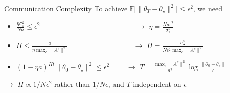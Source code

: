 \documentclass[aspectratio=169,14pt]{beamer}
\begin{document}
\begin{frame}{Communication Complexity}
  To achieve $\mathbb{E} \Big[ \| {\theta_T - \theta_\star} \|^2 \Big] \le \epsilon^2$, we need
  \begin{itemize}
  \item $\frac{\eta \sigma_\star^2}{N a} \le \epsilon^2$ ~~~~~~\,~~~~~~~~~~~~~~~~~~~ $\rightarrow$ $\eta = \frac{N a \epsilon^2}{\sigma_\star^2}$
  \item $H \le \frac{a}{\eta \max_c \| A^c \|^2}$ ~~~~~~~~~~~~~~~~~ $\rightarrow$ $H = \frac{ \sigma_\star^2 }{N \epsilon^2 \max_c \| A^c \|^2}$
  \item $(1 - \eta a)^{H t} \| \theta_0 - \theta_\star \|^2 \le \epsilon^2$ ~~~~$\rightarrow$ $T = \frac{\max_c \| A^c \|^2}{a^2} \log \tfrac{\| \theta_0 - \theta_\star \|}{ \epsilon }$
  \end{itemize}

  $\rightarrow$ $H \propto 1/N\epsilon^2$ rather than $1/N\epsilon$, and $T$ independent on $\epsilon$
\end{frame}
\end{document}
